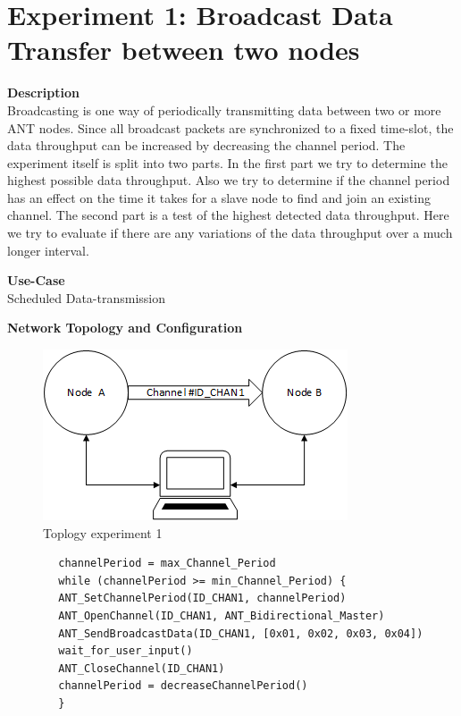 \section{Experiment 1: Broadcast Data Transfer between two nodes}
\begin{description} 
	\item{\textbf{Description}} \hfill \\ Broadcasting is one way of periodically transmitting data between two or more ANT nodes. Since all broadcast packets are synchronized to a fixed time-slot, the data throughput can be increased by decreasing the channel period. The experiment itself is split into two parts. In the first part we try to determine the highest possible data throughput. Also we try to determine if the channel period has an effect on the time it takes for a slave node to find and join an existing channel. The second part is a test of the highest detected data throughput. Here we try to evaluate if there are any variations of the data throughput over a much longer interval.	
	\item{\textbf{Use-Case}} \hfill \\ Scheduled Data-transmission	
	\item{\textbf{Network Topology and Configuration}} \hfill \\ 
	\begin{figure}[h]
		\centering
		\includegraphics[scale=1]{content/images/exp_topo.png}
		\caption{Toplogy experiment 1}
	\end{figure}
	\begin{code}[h]
		\begin{verbatim}
		channelPeriod = max_Channel_Period
		while (channelPeriod >= min_Channel_Period) {
		ANT_SetChannelPeriod(ID_CHAN1, channelPeriod)
		ANT_OpenChannel(ID_CHAN1, ANT_Bidirectional_Master)
		ANT_SendBroadcastData(ID_CHAN1, [0x01, 0x02, 0x03, 0x04])
		wait_for_user_input()
		ANT_CloseChannel(ID_CHAN1)
		channelPeriod = decreaseChannelPeriod()
		}
		\end{verbatim}
		\caption{Broadcast data single channel (Master)}\label{lst:mExp1}
	\end{code}
	

\end{description}

